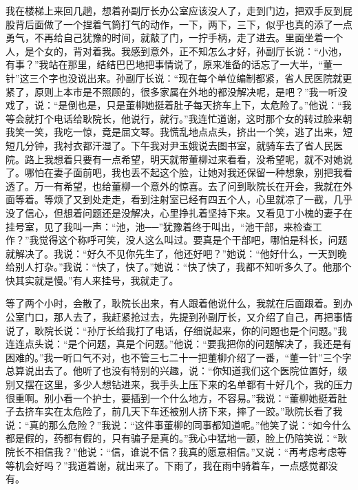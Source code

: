 \documentclass[12pt,oneside]{book}
\begin{document}
我在楼梯上来回几趟，想着孙副厅长办公室应该没人了，走到门边，把双手反到屁股背后面做了一个捏着气筒打气的动作，一下，两下，三下，似乎也真的添了一点勇气，不再给自己犹豫的时间，就敲了门，一拧手柄，走了进去。里面坐着一个人，是个女的，背对着我。我感到意外，正不知怎么才好，孙副厅长说：``小池，有事？''我站在那里，结结巴巴地把事情说了，原来准备的话忘了一大半，``董一针''这三个字也没说出来。孙副厅长说：``现在每个单位编制都紧，省人民医院就更紧了，原则上本市是不照顾的，很多家属在外地的都没解决呢，是吧？''我一听没戏了，说：``是倒也是，只是董柳她挺着肚子每天挤车上下，太危险了。''他说：``我等会就打个电话给耿院长，他说行，就行。''我连忙道谢，这时那个女的转过脸来朝我笑一笑，我吃一惊，竟是屈文琴。我慌乱地点点头，挤出一个笑，逃了出来，短短几分钟，我衬衣都汗湿了。下午我对尹玉娥说去图书室，就骑车去了省人民医院。路上我想着只要有一点希望，明天就带董柳过来看看，没希望呢，就不对她说了。哪怕在妻子面前吧，我也丢不起这个脸，让她对我还保留一种想象，别把我看透了。万一有希望，也给董柳一个意外的惊喜。去了问到耿院长在开会，我就在外面等着。等烦了又到处走走，看到注射室已经有四五个人，心里就凉了一截，几乎没了信心，但想着问题还是没解决，心里挣扎着坚持下来。又看见丁小槐的妻子在挂号室，见了我叫一声：``池，池──''犹豫着终于叫出，``池干部，来检查工作？''我觉得这个称呼可笑，没人这么叫过。要真是个干部吧，哪怕是科长，问题就解决了。我说：``好久不见你先生了，他还好吧？''她说：``他好什么，一天到晚给别人打杂。''我说：``快了，快了。''她说：``快了快了，我都不知听多久了。他那个快其实就是慢。''有人来挂号，我就走了。

等了两个小时，会散了，耿院长出来，有人跟着他说什么，我就在后面跟着。到办公室门口，那人去了，我赶紧抢过去，先提到孙副厅长，又介绍了自己，再把事情说了，耿院长说：``孙厅长给我打了电话，仔细说起来，你的问题也是个问题。''我连连点头说：``是个问题，真是个问题。''他说：``要我把你的问题解决了，我还是有困难的。''我一听口气不对，也不管三七二十一把董柳介绍了一番，``董一针''三个字总算说出去了。他听了也没有特别的兴趣，说：``你知道我们这个医院位置好，级别又摆在这里，多少人想钻进来，我手头上压下来的名单都有十好几个，我的压力很重啊。别小看一个护士，要插到一个什么地方，不容易。''我说：``董柳她挺着肚子去挤车实在太危险了，前几天下车还被别人挤下来，摔了一跤。''耿院长看了我说：``真的那么危险？''我说：``这件事董柳的同事都知道呢。''他笑了说：``如今什么都是假的，药都有假的，只有骗子是真的。''我心中猛地一颤，脸上仍陪笑说：``耿院长不相信我？''他说：``信，谁说不信？我真的愿意相信。''又说：``再考虑考虑等等机会好吗？''我道着谢，就出来了。下雨了，我在雨中骑着车，一点感觉都没有。
\end{document}

